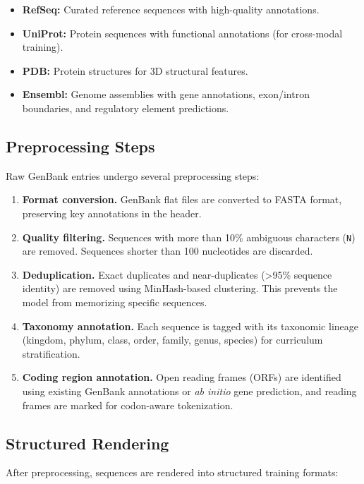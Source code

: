 \begin{itemize}[leftmargin=1.5em]
  \item \textbf{RefSeq:} Curated reference sequences with high-quality annotations.
  \item \textbf{UniProt:} Protein sequences with functional annotations (for cross-modal training).
  \item \textbf{PDB:} Protein structures for 3D structural features.
  \item \textbf{Ensembl:} Genome assemblies with gene annotations, exon/intron boundaries, and regulatory element predictions.
\end{itemize}

\subsection{Preprocessing Steps}

Raw GenBank entries undergo several preprocessing steps:

\begin{enumerate}[leftmargin=1.8em]
  \item \textbf{Format conversion.} GenBank flat files are converted to FASTA format, preserving key annotations in the header.
  \item \textbf{Quality filtering.} Sequences with more than 10\% ambiguous characters (\texttt{N}) are removed. Sequences shorter than 100 nucleotides are discarded.
  \item \textbf{Deduplication.} Exact duplicates and near-duplicates (>95\% sequence identity) are removed using MinHash-based clustering. This prevents the model from memorizing specific sequences.
  \item \textbf{Taxonomy annotation.} Each sequence is tagged with its taxonomic lineage (kingdom, phylum, class, order, family, genus, species) for curriculum stratification.
  \item \textbf{Coding region annotation.} Open reading frames (ORFs) are identified using existing GenBank annotations or \emph{ab initio} gene prediction, and reading frames are marked for codon-aware tokenization.
\end{enumerate}

\subsection{Structured Rendering}

After preprocessing, sequences are rendered into structured training formats:

